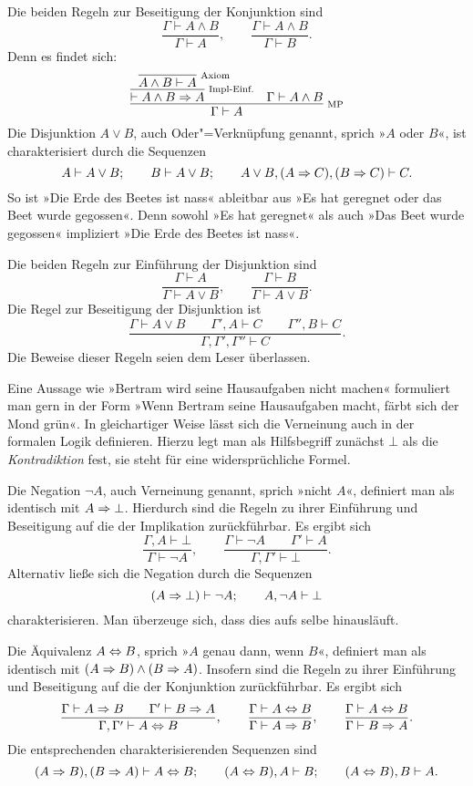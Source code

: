 Die beiden Regeln zur Beseitigung der Konjunktion sind
\[\dfrac{\Gamma\vdash A\land B}{\Gamma\vdash A},
\qquad\dfrac{\Gamma\vdash A\land B}{\Gamma\vdash B}.\]
Denn es findet sich:
\[
\infer[\infernote{MP}]{\Gamma\vdash A}{
  \infer[\infernote{Impl-Einf.}]{\vdash A\land B\cond A}{
    \infer[\infernote{Axiom}]{A\land B\vdash A}{}}
& \Gamma\vdash A\land B}
\]
Die Disjunktion $A\lor B$, auch Oder"=Verknüpfung
genannt, sprich »$A$ oder $B$«, ist charakterisiert durch die Sequenzen
\[A\vdash A\lor B;\qquad B\vdash A\lor B;\qquad
A\lor B, (A\Rightarrow C), (B\Rightarrow C)\vdash C.\]
So ist »Die Erde des Beetes ist nass« ableitbar aus »Es hat geregnet
oder das Beet wurde gegossen«. Denn sowohl »Es hat geregnet« als auch
»Das Beet wurde gegossen« impliziert »Die Erde des Beetes ist nass«.

Die beiden Regeln zur Einführung der Disjunktion sind
\[\dfrac{\Gamma\vdash A}{\Gamma\vdash A\lor B},\qquad
\dfrac{\Gamma\vdash B}{\Gamma\vdash A\lor B}.\]
Die Regel zur Beseitigung der Disjunktion ist
\[\dfrac{\Gamma\vdash A\lor B\qquad\Gamma',A\vdash C\qquad\Gamma'',B\vdash C}
{\Gamma,\Gamma',\Gamma''\vdash C}.\]
Die Beweise dieser Regeln seien dem Leser überlassen.

Eine Aussage wie »Bertram wird seine Hausaufgaben nicht machen«
formuliert man gern in der Form »Wenn Bertram seine Hausaufgaben macht,
färbt sich der Mond grün«. In gleichartiger Weise lässt sich die
Verneinung auch in der formalen Logik definieren. Hierzu legt man als
Hilfsbegriff zunächst $\bot$ als die \emph{Kontradiktion}%
 fest, sie steht für eine widersprüchliche Formel.

Die Negation $\lnot A$, auch Verneinung genannt, sprich
»nicht $A$«, definiert man als identisch mit $A\Rightarrow\bot$. Hierdurch
sind die Regeln zu ihrer Einführung und Beseitigung auf die der
Implikation zurückführbar. Es ergibt sich
\[\dfrac{\Gamma,A\vdash\bot}{\Gamma\vdash\lnot A},
\qquad\dfrac{\Gamma\vdash\lnot A\qquad\Gamma'\vdash A}
{\Gamma,\Gamma'\vdash\bot}.\]
Alternativ ließe sich die Negation durch die Sequenzen
\[(A\Rightarrow\bot)\vdash\lnot A;\qquad A,\lnot A\vdash\bot\]
charakterisieren. Man überzeuge sich, dass dies aufs selbe hinausläuft.

Die Äquivalenz $A\Leftrightarrow B$, sprich
»$A$ genau dann, wenn $B$«, definiert man als identisch mit
$(A\Rightarrow B)\land (B\Rightarrow A)$. Insofern sind die Regeln zu ihrer
Einführung und Beseitigung auf die der Konjunktion zurückführbar.
Es ergibt sich
\[\dfrac{\Gamma\vdash A\Rightarrow B\qquad\Gamma'\vdash B\Rightarrow A}
{\Gamma,\Gamma'\vdash A\Leftrightarrow B},\qquad
\dfrac{\Gamma\vdash A\Leftrightarrow B}{\Gamma\vdash A\Rightarrow B},\qquad
\dfrac{\Gamma\vdash A\Leftrightarrow B}{\Gamma\vdash B\Rightarrow A}.\]
Die entsprechenden charakterisierenden Sequenzen sind
\[(A\Rightarrow B),(B\Rightarrow A)\vdash A\Leftrightarrow B;\qquad (A\Leftrightarrow B),A\vdash B;
\qquad (A\Leftrightarrow B),B\vdash A.\]


